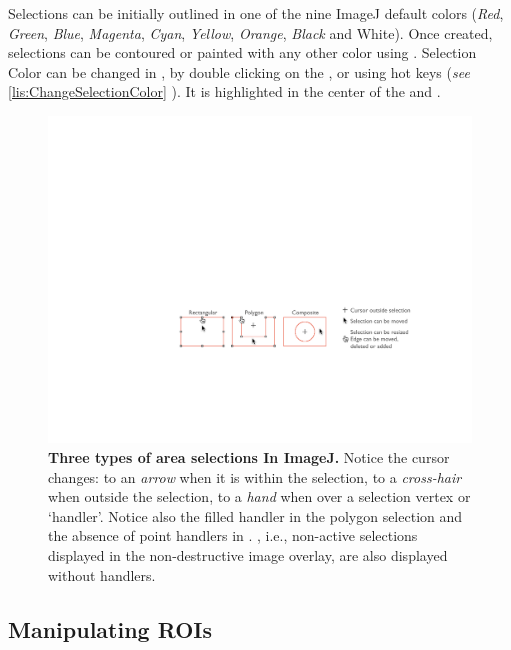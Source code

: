 Selections can be initially outlined in one of the nine ImageJ default
colors (\emph{Red}, \emph{Green}, \emph{Blue}, \emph{Magenta}, \emph{Cyan},
\emph{Yellow}, \emph{Orange}, \emph{Black} and White). Once created,
selections can be contoured or painted with any other color using\textsf{
}.
Selection Color can be changed in ,
by double clicking on the , or using hot
keys (\emph{see} \eqref{lis:ChangeSelectionColor} ).
It is highlighted in the center of the  and
.
\begin{figure}[h]
\noindent \includegraphics[width=0.88\columnwidth]{images/Selections}\caption{\textbf{\label{fig:exampleAreaROIs}Three types of area selections
In ImageJ.} Notice the cursor changes: to an \emph{arrow} when it
is within the selection, to a \emph{cross-hair} when outside the selection,
to a \emph{hand} when over a selection vertex or `handler'. Notice
also the filled handler in the polygon selection and the absence of
point handlers in . ,
i.e., non-active selections displayed in the non-destructive image
overlay, are also displayed without handlers.}
\end{figure}



\subsection{Manipulating ROIs\label{sub:Manipulating-ROIs}}

